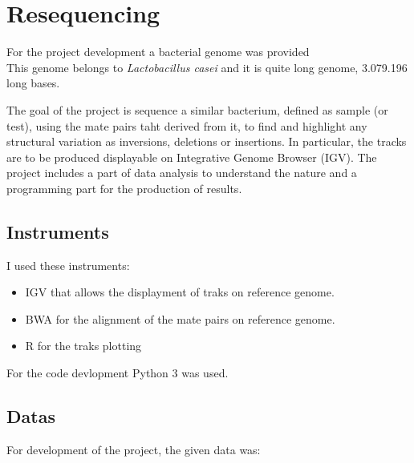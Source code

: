 
\chapter{Resequencing}
\label{cap:resequencing}

For the project development a bacterial genome was provided\\

This genome belongs to \emph{Lactobacillus casei} and it is quite long genome, 3.079.196 long bases.

The goal of the project is sequence a similar bacterium, defined as sample (or test), using the mate pairs taht derived from it, to find and highlight any structural variation as inversions, deletions or insertions. In particular, the tracks are to be produced displayable on Integrative Genome Browser (IGV).
The project includes a part of data analysis to understand the nature and a programming part for the production of results.

\section{Instruments}

I used these instruments:
\begin{itemize}
\item IGV that allows the displayment of traks on reference genome.
\item BWA for the alignment of the mate pairs on reference genome.
\item R for the traks plotting
\end{itemize}

For the code devlopment Python 3 was used.

\section{Datas}

For development of the project, the given data was:


